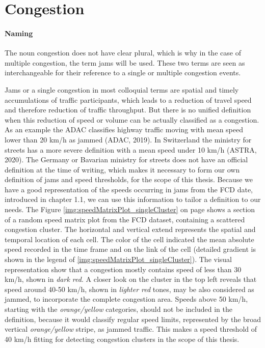 \documentclass[a4paper,12pt]{report}
\begin{document}
\section{Congestion}
\paragraph{Naming} The noun congestion does not have clear plural, which is why in the case of multiple congestion, the term jams will be used. These two terms are seen as interchangeable for their reference to a single or multiple congestion events.
\par Jams or a single congestion in most colloquial terms are spatial and timely accumulations of traffic participants, which leads to a reduction of travel speed and therefore reduction of traffic throughput. But there is no unified definition when this reduction of speed or volume can be actually classified as a congestion. As an example the ADAC classifies highway traffic moving with mean speed lower than 20 km/h as jammed (ADAC, 2019). In Switzerland the ministry for streets has a more severe definition with a mean speed under 10 km/h (ASTRA, 2020). The Germany or Bavarian ministry for streets does not have an official definition at the time of writing, which makes it necessary to form our own definition of jams and speed thresholds, for the scope of this thesis. Because we have a good representation of the speeds occurring in jams from the FCD date, introduced in chapter 1.1, we can use this information to tailor a definition to our needs. The Figure \ref{img:speedMatrixPlot_singleCluster} on page \pageref{img:speedMatrixPlot_singleCluster} shows a section of a random speed matrix plot from the FCD dataset, containing a scattered congestion cluster. The horizontal and vertical extend represents the spatial and temporal location of each cell. The color of the cell indicated the mean absolute speed recorded in the time frame and on the link of the cell (detailed gradient is shown in the legend of \ref{img:speedMatrixPlot_singleCluster}). The visual representation show that a congestion mostly contains speed of less than 30 km/h, shown in \textit{dark red}. A closer look on the cluster in the top left reveals that speed around 40-50 km/h, shown in \textit{lighter red} tones, may be also considered as jammed, to incorporate the complete congestion area. Speeds above 50 km/h, starting with the \textit{orange/yellow} categories, should not be included in the definition, because it would classify regular speed limits, represented by the broad vertical \textit{orange/yellow} stripe, as jammed traffic. This makes a speed threshold of 40 km/h fitting for detecting congestion clusters in the scope of this thesis.
\end{document}

